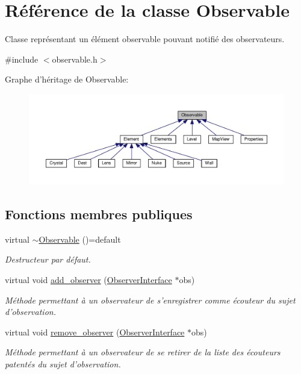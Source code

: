 \hypertarget{classObservable}{\section{Référence de la classe Observable}
\label{classObservable}
}


Classe représentant un élément observable pouvant notifié des observateurs.  




{\ttfamily \#include $<$observable.\+h$>$}



Graphe d'héritage de Observable\+:\nopagebreak
\begin{figure}[H]
\begin{center}
\leavevmode
\includegraphics[width=350pt]{d7/d7e/classObservable__inherit__graph}
\end{center}
\end{figure}
\subsection*{Fonctions membres publiques}
\begin{DoxyCompactItemize}
\item 
\hypertarget{classObservable_a058acb5a674eba2b96648c66a27440d8}{virtual \hyperlink{classObservable_a058acb5a674eba2b96648c66a27440d8}{$\sim$\+Observable} ()=default}\label{classObservable_a058acb5a674eba2b96648c66a27440d8}

\begin{DoxyCompactList}\small\item\em Destructeur par défaut. \end{DoxyCompactList}\item 
virtual void \hyperlink{classObservable_a4d816915e134f1585a3f4151c6d74b1f}{add\+\_\+observer} (\hyperlink{classObserverInterface}{Observer\+Interface} $\ast$obs)
\begin{DoxyCompactList}\small\item\em Méthode permettant à un observateur de s'enregistrer comme écouteur du sujet d'observation. \end{DoxyCompactList}\item 
virtual void \hyperlink{classObservable_a79bdffc61fbea9b16d00d5bc6a2289ad}{remove\+\_\+observer} (\hyperlink{classObserverInterface}{Observer\+Interface} $\ast$obs)
\begin{DoxyCompactList}\small\item\em Méthode permettant à un observateur de se retirer de la liste des écouteurs patentés du sujet d'observation. \end{DoxyCompactList}\end{DoxyCompactItemize}
